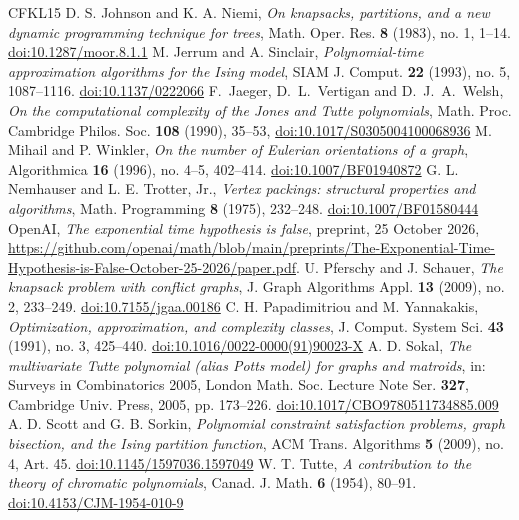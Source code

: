 \documentclass[11pt,reqno]{amsart}
\numberwithin{equation}{section}
\theoremstyle{plain}
\theoremstyle{definition}
\theoremstyle{remark}
\begin{document}
\begin{thebibliography}{CFKL15}
 D. S. Johnson and K. A. Niemi, \emph{On knapsacks, partitions, and a new dynamic programming technique for trees}, Math. Oper. Res. \textbf{8} (1983), no. 1, 1--14. \href{https://doi.org/10.1287/moor.8.1.1}{doi:10.1287/moor.8.1.1}
 M. Jerrum and A. Sinclair, \emph{Polynomial-time approximation algorithms for the Ising model}, SIAM J. Comput. \textbf{22} (1993), no. 5, 1087--1116. \href{https://doi.org/10.1137/0222066}{doi:10.1137/0222066}
 F.~Jaeger, D.~L.~Vertigan and D.~J.~A.~Welsh, \emph{On the computational complexity of the Jones and Tutte polynomials}, Math. Proc. Cambridge Philos. Soc. \textbf{108} (1990), 35--53, \href{https://doi.org/10.1017/S0305004100068936}{doi:10.1017/S0305004100068936}
 M. Mihail and P. Winkler, \emph{On the number of Eulerian orientations of a graph}, Algorithmica \textbf{16} (1996), no. 4--5, 402--414. \href{https://doi.org/10.1007/BF01940872}{doi:10.1007/BF01940872}
 G. L. Nemhauser and L. E. Trotter, Jr., \emph{Vertex packings: structural properties and algorithms}, Math. Programming \textbf{8} (1975), 232--248. \href{https://doi.org/10.1007/BF01580444}{doi:10.1007/BF01580444}
 OpenAI, \emph{The exponential time hypothesis is false}, preprint, 25 October 2026, \url{https://github.com/openai/math/blob/main/preprints/The-Exponential-Time-Hypothesis-is-False-October-25-2026/paper.pdf}.
 U. Pferschy and J. Schauer, \emph{The knapsack problem with conflict graphs}, J. Graph Algorithms Appl. \textbf{13} (2009), no. 2, 233--249. \href{https://doi.org/10.7155/jgaa.00186}{doi:10.7155/jgaa.00186}
 C. H. Papadimitriou and M. Yannakakis, \emph{Optimization, approximation, and complexity classes}, J. Comput. System Sci. \textbf{43} (1991), no. 3, 425--440. \href{https://doi.org/10.1016/0022-0000(91)90023-X}{doi:10.1016/0022-0000(91)90023-X}
 A. D. Sokal, \emph{The multivariate Tutte polynomial (alias Potts model) for graphs and matroids}, in: Surveys in Combinatorics 2005, London Math. Soc. Lecture Note Ser. \textbf{327}, Cambridge Univ. Press, 2005, pp. 173--226. \href{https://doi.org/10.1017/CBO9780511734885.009}{doi:10.1017/CBO9780511734885.009}
 A. D. Scott and G. B. Sorkin, \emph{Polynomial constraint satisfaction problems, graph bisection, and the Ising partition function}, ACM Trans. Algorithms \textbf{5} (2009), no. 4, Art. 45. \href{https://doi.org/10.1145/1597036.1597049}{doi:10.1145/1597036.1597049}
 W. T. Tutte, \emph{A contribution to the theory of chromatic polynomials}, Canad. J. Math. \textbf{6} (1954), 80--91. \href{https://doi.org/10.4153/CJM-1954-010-9}{doi:10.4153/CJM-1954-010-9}

\end{thebibliography}
\end{document}
